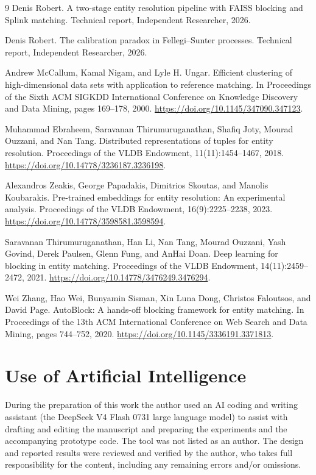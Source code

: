 \documentclass[11pt]{article}
\begin{document}
\begin{thebibliography}{9}
Denis Robert.
\newblock A two-stage entity resolution pipeline with FAISS blocking and Splink matching.
\newblock Technical report, Independent Researcher, 2026.

Denis Robert.
\newblock The calibration paradox in Fellegi--Sunter processes.
\newblock Technical report, Independent Researcher, 2026.

Andrew McCallum, Kamal Nigam, and Lyle H. Ungar.
\newblock Efficient clustering of high-dimensional data sets with application to reference matching.
\newblock In Proceedings of the Sixth ACM SIGKDD International Conference on Knowledge Discovery and Data Mining, pages 169--178, 2000.
\newblock \url{https://doi.org/10.1145/347090.347123}.

Muhammad Ebraheem, Saravanan Thirumuruganathan, Shafiq Joty, Mourad Ouzzani, and Nan Tang.
\newblock Distributed representations of tuples for entity resolution.
\newblock Proceedings of the VLDB Endowment, 11(11):1454--1467, 2018.
\newblock \url{https://doi.org/10.14778/3236187.3236198}.

Alexandros Zeakis, George Papadakis, Dimitrios Skoutas, and Manolis Koubarakis.
\newblock Pre-trained embeddings for entity resolution: An experimental analysis.
\newblock Proceedings of the VLDB Endowment, 16(9):2225--2238, 2023.
\newblock \url{https://doi.org/10.14778/3598581.3598594}.

Saravanan Thirumuruganathan, Han Li, Nan Tang, Mourad Ouzzani, Yash Govind, Derek Paulsen, Glenn Fung, and AnHai Doan.
\newblock Deep learning for blocking in entity matching.
\newblock Proceedings of the VLDB Endowment, 14(11):2459--2472, 2021.
\newblock \url{https://doi.org/10.14778/3476249.3476294}.

Wei Zhang, Hao Wei, Bunyamin Sisman, Xin Luna Dong, Christos Faloutsos, and David Page.
\newblock AutoBlock: A hands-off blocking framework for entity matching.
\newblock In Proceedings of the 13th ACM International Conference on Web Search and Data Mining, pages 744--752, 2020.
\newblock \url{https://doi.org/10.1145/3336191.3371813}.
\end{thebibliography}

\section*{Use of Artificial Intelligence}
During the preparation of this work the author used an AI coding and writing assistant (the
DeepSeek V4 Flash 0731 large language model) to assist with drafting and editing the
manuscript and preparing the experiments and the accompanying prototype code. The tool was
not listed as an author. The design and reported results were reviewed and verified by the
author, who takes full responsibility for the content, including any remaining errors and/or
omissions.
\end{document}
